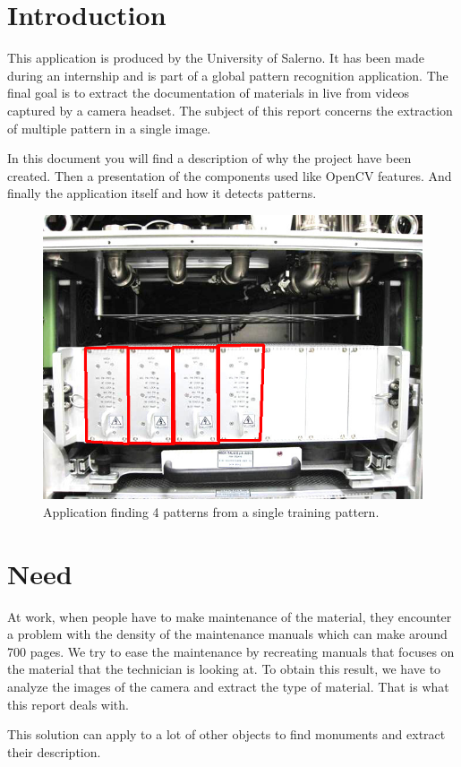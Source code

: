 \documentclass[english,a4paper,11pt]{report}
\begin{document}
	\tableofcontents
	\newpage
	
	
	\chapter{Introduction}
		\par This application is produced by the University of Salerno. It has been made during an internship and is part of a global pattern recognition application. The final goal is to extract the documentation of materials in live from videos captured by a camera headset. The subject of this report concerns the extraction of multiple pattern in a single image.
		\par In this document you will find a description of why the project have been created. Then a presentation of the components used like OpenCV features. And finally the application itself and how it detects patterns.\\
		
		\begin{figure}[h]
			\begin{center}
				\includegraphics[scale=0.7]{images_not_compressed/intro.png}
				\caption{Application finding 4 patterns from a single training pattern.}
			\end{center}
		\end{figure}
		
		
	
	\chapter{Need}
		\par At work, when people have to make maintenance of the material, they encounter a problem with the density of the maintenance manuals which can make around 700 pages. We try to ease the maintenance by recreating manuals that focuses on the material that the technician is looking at. To obtain this result, we have to analyze the images of the camera and extract the type of material. That is what this report deals with.
		\par This solution can apply to a lot of other objects to find monuments and extract their description. \\
		
\end{document}
